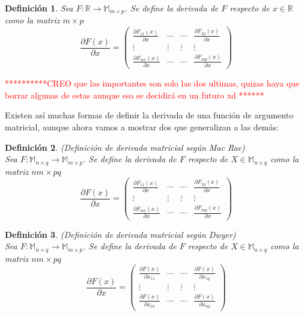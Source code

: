 \documentclass{article}
\theoremstyle{theorem-style}  %
\theoremstyle{definition-style}
\newtheorem{definition}{Definición}[section]
\theoremstyle{example-style}
\theoremstyle{exercise-style}
\begin{document}
	\begin{definition}
		Sea $F:\mathbb{R}\rightarrow \mathbb{M}_{m\times p}$. Se define la derivada de $F$ respecto de $x\in \mathbb{R}$ como la matriz $m\times p$
		$$ \frac{\partial F(x)}{\partial x} = \left( \begin{array}{cccc}
		\frac{\partial F_{11}(x)}{\partial x} & \cdots & \cdots & \frac{\partial F_{1p}(x)}{\partial x}\\
		\vdots & \vdots & \vdots & \vdots \\
		\frac{\partial F_{m1}(x)}{\partial x} & \cdots & \cdots & \frac{\partial F_{mp}(x)}{\partial x}
		\end{array}\right)$$	
	\end{definition}
	
	\textcolor{red}{**********CREO que las importantes son solo las dos ultimas, quizas haya que borrar algunas de estas aunque eso se decidirá en un futuro xd ******}
	
	Existen así muchas formas de definir la derivada de una función de argumento matricial, aunque ahora vamos a mostrar dos que generalizan a las demás:
	
	\begin{definition}
		(Definición de derivada matricial según Mac Rae)\\
		Sea $F:\mathbb{M}_{n\times q}\rightarrow \mathbb{M}_{m\times p}$. Se define la derivada de $F$ respecto de $X\in \mathbb{M}_{n\times q}$ como la matriz $nm\times pq$
		$$ \frac{\partial F(x)}{\partial x} = \left( \begin{array}{cccc}
		\frac{\partial F_{11}(x)}{\partial x} & \cdots & \cdots & \frac{\partial F_{1p}(x)}{\partial x}\\
		\vdots & \vdots & \vdots & \vdots \\
		\frac{\partial F_{m1}(x)}{\partial x} & \cdots & \cdots & \frac{\partial F_{mp}(x)}{\partial x}
		\end{array}\right)$$	
	\end{definition}
	
	\begin{definition}
		(Definición de derivada matricial según Dwyer)\\
		Sea $F:\mathbb{M}_{n\times q}\rightarrow \mathbb{M}_{m\times p}$. Se define la derivada de $F$ respecto de $X\in \mathbb{M}_{n\times q}$ como la matriz $nm\times pq$
		$$ \frac{\partial F(x)}{\partial x} = \left( \begin{array}{cccc}
		\frac{\partial F(x)}{\partial x_{11}} & \cdots & \cdots & \frac{\partial F(x)}{\partial x_{1q}}\\
		\vdots & \vdots & \vdots & \vdots \\
		\frac{\partial F(x)}{\partial x_{n1}} & \cdots & \cdots & \frac{\partial F(x)}{\partial x_{nq}}
		\end{array}\right)$$	
	\end{definition}
	
\end{document}
